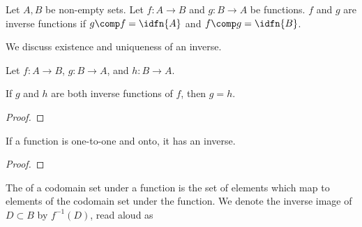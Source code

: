 Let $A, B$ be non-empty sets.
Let $f: A \to B$ and $g: B \to A$
be functions.
$f$ and $g$ are inverse functions
if $g \comp f = \idfn{A}$
and $f \comp g = \idfn{B}$.


We discuss existence and
uniqueness of an inverse.

\begin{prop}
  Let $f: A \to B$,
  $g: B \to A$,
  and $h: B \to A$.

  If $g$ and $h$
  are both inverse
  functions of $f$,
  then $g = h$.

  \begin{proof}
  \end{proof}
\end{prop}

\begin{prop}
  If a function is one-to-one
  and onto, it has an inverse.

  \begin{proof}
  \end{proof}
\end{prop}


The  of a codomain
set under a function is the set of
elements which map to elements of
the codomain set under the function.
We denote the inverse image of $D \subset B$ by $f^{-1}(D)$, read aloud as 
